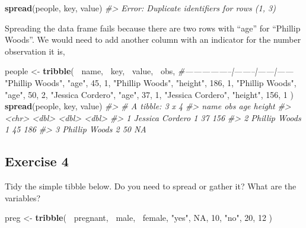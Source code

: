 \documentclass[]{book}
\newenvironment{Shaded}{\begin{snugshade}}{\end{snugshade}}
\newcommand{\CommentTok}[1]{\textcolor[rgb]{0.56,0.35,0.01}{\textit{#1}}}
\newcommand{\DecValTok}[1]{\textcolor[rgb]{0.00,0.00,0.81}{#1}}
\newcommand{\KeywordTok}[1]{\textcolor[rgb]{0.13,0.29,0.53}{\textbf{#1}}}
\newcommand{\NormalTok}[1]{#1}
\newcommand{\OperatorTok}[1]{\textcolor[rgb]{0.81,0.36,0.00}{\textbf{#1}}}
\newcommand{\OtherTok}[1]{\textcolor[rgb]{0.56,0.35,0.01}{#1}}
\newcommand{\StringTok}[1]{\textcolor[rgb]{0.31,0.60,0.02}{#1}}
\theoremstyle{plain}
\theoremstyle{remark}
\theoremstyle{definition}
\theoremstyle{definition}
\theoremstyle{definition}
\theoremstyle{remark}
\begin{document}
\begin{Shaded}
\begin{Highlighting}[]
\KeywordTok{spread}\NormalTok{(people, key, value)}
\CommentTok{#> Error: Duplicate identifiers for rows (1, 3)}
\end{Highlighting}
\end{Shaded}

Spreading the data frame fails because there are two rows with ``age''
for ``Phillip Woods''. We would need to add another column with an
indicator for the number observation it is,

\begin{Shaded}
\begin{Highlighting}[]
\NormalTok{people <-}\StringTok{ }\KeywordTok{tribble}\NormalTok{(}
  \OperatorTok{~}\NormalTok{name,             }\OperatorTok{~}\NormalTok{key,    }\OperatorTok{~}\NormalTok{value, }\OperatorTok{~}\NormalTok{obs,}
  \CommentTok{#-----------------|--------|------|------}
  \StringTok{"Phillip Woods"}\NormalTok{,   }\StringTok{"age"}\NormalTok{,       }\DecValTok{45}\NormalTok{, }\DecValTok{1}\NormalTok{,}
  \StringTok{"Phillip Woods"}\NormalTok{,   }\StringTok{"height"}\NormalTok{,   }\DecValTok{186}\NormalTok{, }\DecValTok{1}\NormalTok{,}
  \StringTok{"Phillip Woods"}\NormalTok{,   }\StringTok{"age"}\NormalTok{,       }\DecValTok{50}\NormalTok{, }\DecValTok{2}\NormalTok{,}
  \StringTok{"Jessica Cordero"}\NormalTok{, }\StringTok{"age"}\NormalTok{,       }\DecValTok{37}\NormalTok{, }\DecValTok{1}\NormalTok{,}
  \StringTok{"Jessica Cordero"}\NormalTok{, }\StringTok{"height"}\NormalTok{,   }\DecValTok{156}\NormalTok{, }\DecValTok{1}
\NormalTok{)}
\KeywordTok{spread}\NormalTok{(people, key, value)}
\CommentTok{#> # A tibble: 3 x 4}
\CommentTok{#>   name              obs   age height}
\CommentTok{#>   <chr>           <dbl> <dbl>  <dbl>}
\CommentTok{#> 1 Jessica Cordero     1    37    156}
\CommentTok{#> 2 Phillip Woods       1    45    186}
\CommentTok{#> 3 Phillip Woods       2    50     NA}
\end{Highlighting}
\end{Shaded}

\hypertarget{exercise-4-15}{%
\subsection{Exercise 4}\label{exercise-4-15}}

Tidy the simple tibble below. Do you need to spread or gather it? What
are the variables?

\begin{Shaded}
\begin{Highlighting}[]
\NormalTok{preg <-}\StringTok{ }\KeywordTok{tribble}\NormalTok{(}
  \OperatorTok{~}\NormalTok{pregnant, }\OperatorTok{~}\NormalTok{male, }\OperatorTok{~}\NormalTok{female,}
  \StringTok{"yes"}\NormalTok{,     }\OtherTok{NA}\NormalTok{,    }\DecValTok{10}\NormalTok{,}
  \StringTok{"no"}\NormalTok{,      }\DecValTok{20}\NormalTok{,    }\DecValTok{12}
\NormalTok{)}
\end{Highlighting}
\end{Shaded}
\end{document}
